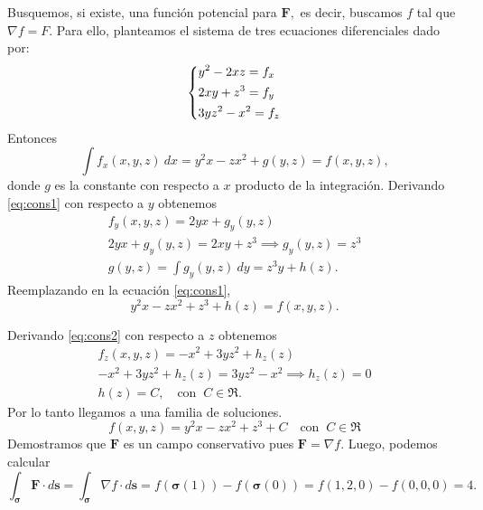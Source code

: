 \begin{solution}
Busquemos, si existe,  una funci\'on potencial para $\mathbf{F},$ es decir, buscamos $f$ tal que $\nabla f = F.$ Para ello,  planteamos el sistema de tres ecuaciones diferenciales dado por:
\[\begin{dcases}
        y^2-2xz=f_x \\
        2xy+z^3=f_y \\
        3yz^2-x^2=f_z
    \end{dcases}\]
Entonces
\begin{equation}
    \int f_x(x,y,z)\:dx=y^2x-zx^2+g(y,z)=f(x,y,z), \label{eq:cons1}
\end{equation}
donde $g$ es la constante con respecto a $x$ producto de la integraci\'on. Derivando \eqref{eq:cons1} con respecto a $y$ obtenemos
\begin{gather*}
    f_y(x,y,z)= 2yx+g_y(y,z)\\[.2cm]
    2yx+g_y(y,z)  = 2xy+z^3 \implies g_y(y,z)=z^3\\[.2cm]
    g(y,z)=\int  g_y(y,z) \:dy =  z^3y+h(z).
\end{gather*}
Reemplazando en  la ecuaci\'on \eqref{eq:cons1},
\begin{equation}
y^2x-zx^2+z^3+h(z) =  f(x,y,z).   \label{eq:cons2}
\end{equation}

Derivando \eqref{eq:cons2} con respecto a $z$ obtenemos
\begin{gather*}
    f_z(x,y,z)=-x^2+3yz^2+h_z(z)\\
    -x^2+3yz^2+h_z(z)=3yz^2-x^2   \implies h_z(z) =0 \\[.2cm]
    h(z) = C,\quad\text{con}\;\;C\in\Re.
\end{gather*}
Por lo tanto llegamos a una familia de soluciones.
\[
    f(x,y,z)=y^2x-zx^2+z^3+C  \quad\text{con}\;\;C\in\Re
\]
Demostramos que $\mathbf{F}$ es un campo conservativo pues $\mathbf{F}=\nabla f.$ Luego, podemos calcular
\[
    \int _{\boldsymbol{\sigma}} \mathbf{F}\cdot d\mathbf{s}=
    \int _{\boldsymbol{\sigma}} \nabla f\cdot d\mathbf{s} = f(\boldsymbol{\sigma}(1))-f(\boldsymbol{\sigma}(0))=f(1,2,0)-f(0,0,0)=4.
\]
\end{solution}


